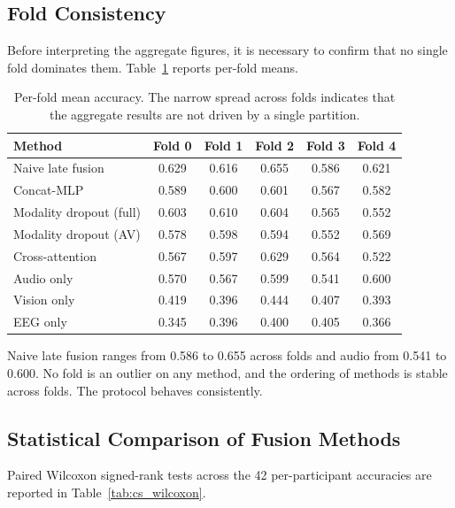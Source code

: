 \subsection{Fold Consistency}

Before interpreting the aggregate figures, it is necessary to confirm that no single
fold dominates them. Table~\ref{tab:cs_perfold} reports per-fold means.

\begin{table}[htbp]
\centering
\caption{Per-fold mean accuracy. The narrow spread across folds indicates that the
aggregate results are not driven by a single partition.}
\label{tab:cs_perfold}
\begin{tabular}{lccccc}
\hline
\textbf{Method} & \textbf{Fold 0} & \textbf{Fold 1} & \textbf{Fold 2} & \textbf{Fold 3} & \textbf{Fold 4} \\
\hline
Naive late fusion       & 0.629 & 0.616 & 0.655 & 0.586 & 0.621 \\
Concat-MLP              & 0.589 & 0.600 & 0.601 & 0.567 & 0.582 \\
Modality dropout (full) & 0.603 & 0.610 & 0.604 & 0.565 & 0.552 \\
Modality dropout (AV)   & 0.578 & 0.598 & 0.594 & 0.552 & 0.569 \\
Cross-attention         & 0.567 & 0.597 & 0.629 & 0.564 & 0.522 \\
Audio only              & 0.570 & 0.567 & 0.599 & 0.541 & 0.600 \\
Vision only             & 0.419 & 0.396 & 0.444 & 0.407 & 0.393 \\
EEG only                & 0.345 & 0.396 & 0.400 & 0.405 & 0.366 \\
\hline
\end{tabular}
\end{table}

Naive late fusion ranges from 0.586 to 0.655 across folds and audio from 0.541 to
0.600. No fold is an outlier on any method, and the ordering of methods is stable
across folds. The protocol behaves consistently.

\subsection{Statistical Comparison of Fusion Methods}

Paired Wilcoxon signed-rank tests across the 42 per-participant accuracies are
reported in Table~\ref{tab:cs_wilcoxon}.

